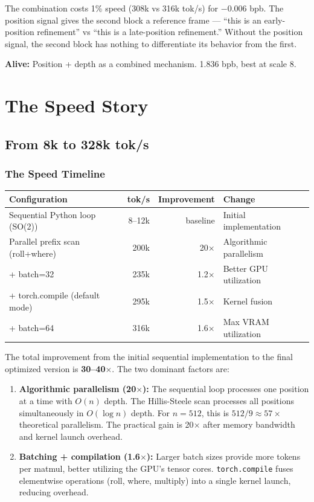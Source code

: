 \documentclass[11pt,a4paper]{report}
\newcommand{\alive}[1]{\textcolor{alive}{\textbf{Alive:}} #1}
\begin{document}
The combination costs 1\% speed (308k vs 316k tok/s) for $-$0.006 bpb. The position signal gives the second block a reference frame --- ``this is an early-position refinement'' vs ``this is a late-position refinement.'' Without the position signal, the second block has nothing to differentiate its behavior from the first.

\alive{Position + depth as a combined mechanism. 1.836 bpb, best at scale 8.}


\part{The Speed Story}
\label{part:speed}

\chapter{From 8k to 328k tok/s}

\section{The Speed Timeline}

\begin{center}
\begin{tabular}{lrrl}
\toprule
Configuration & tok/s & Improvement & Change \\
\midrule
Sequential Python loop (SO(2)) & 8--12k & baseline & Initial implementation \\
Parallel prefix scan (roll+where) & 200k & 20$\times$ & Algorithmic parallelism \\
+ batch=32 & 235k & 1.2$\times$ & Better GPU utilization \\
+ torch.compile (default mode) & 295k & 1.5$\times$ & Kernel fusion \\
+ batch=64 & 316k & 1.6$\times$ & Max VRAM utilization \\
\bottomrule
\end{tabular}
\end{center}

The total improvement from the initial sequential implementation to the final optimized version is \textbf{30--40$\times$}. The two dominant factors are:

\begin{enumerate}[nosep]
\item \textbf{Algorithmic parallelism (20$\times$):} The sequential loop processes one position at a time with $O(n)$ depth. The Hillis-Steele scan processes all positions simultaneously in $O(\log n)$ depth. For $n = 512$, this is $512 / 9 \approx 57\times$ theoretical parallelism. The practical gain is 20$\times$ after memory bandwidth and kernel launch overhead.

\item \textbf{Batching + compilation (1.6$\times$):} Larger batch sizes provide more tokens per matmul, better utilizing the GPU's tensor cores. \texttt{torch.compile} fuses elementwise operations (roll, where, multiply) into a single kernel launch, reducing overhead.
\end{enumerate}
\end{document}
